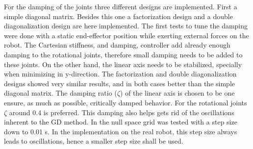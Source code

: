 For the damping of the joints three different designs are implemented. First a simple diagonal matrix. Besides this one a factorization design and a double diagonalization design \cite{alin_damping} are here implemented. The first tests to tune the damping were  done with a static end-effector position while exerting external forces on the robot. The Cartesian stiffness, and damping, controller add already enough damping to the rotational joints, therefore small damping needs to be added to these joints. On the other hand, the linear axis needs to be stabilized, specially when minimizing in y-direction. The factorization and double diagonalization designs showed very similar results, and in both cases better than the simple diagonal matrix. The  damping ratio ($\zeta$) of the linear axis is chosen to be one ensure, as much as possible, critically damped behavior. For the rotational joints $\zeta$ around 0.4 is preferred.
This damping also helps gets rid of the oscillations inherent to the GD method.
In \cite{fabianthesis} the null space grid was tested with a step size down to 0.01 s. In the  implementation on the real robot,  this step size  always leads to oscillations, hence  a smaller step size shall be used.






